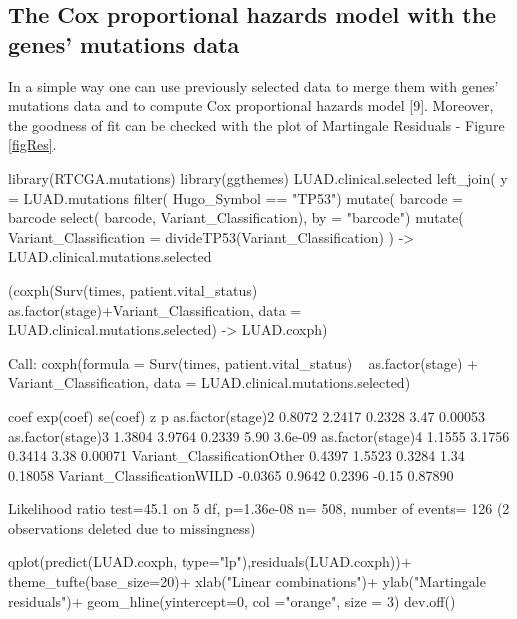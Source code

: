 \newpage

\subsection{The Cox proportional hazards model with the genes' mutations
data}\label{the-cox-proportional-hazards-model-with-the-genes-mutations-data}

In a simple way one can use previously selected data to merge them with
genes' mutations data and to compute Cox proportional hazards model
{[}9{]}. Moreover, the goodness of fit can be checked with the plot of
Martingale Residuals - Figure \ref{figRes}.

\begin{Schunk}
\begin{Sinput}
library(RTCGA.mutations)
library(ggthemes)
LUAD.clinical.selected %
      left_join( y = LUAD.mutations %
                    filter( Hugo_Symbol == "TP53") %
                    mutate( barcode = barcode %
                    select( barcode, Variant_Classification),
                 by = "barcode") %
                    mutate( Variant_Classification = divideTP53(Variant_Classification) ) ->
   LUAD.clinical.mutations.selected

(coxph(Surv(times, patient.vital_status)~ as.factor(stage)+Variant_Classification,
      data = LUAD.clinical.mutations.selected) -> LUAD.coxph)
\end{Sinput}
\begin{Soutput}
Call:
coxph(formula = Surv(times, patient.vital_status) ~ as.factor(stage) + 
    Variant_Classification, data = LUAD.clinical.mutations.selected)


                               coef exp(coef) se(coef)     z       p
as.factor(stage)2            0.8072    2.2417   0.2328  3.47 0.00053
as.factor(stage)3            1.3804    3.9764   0.2339  5.90 3.6e-09
as.factor(stage)4            1.1555    3.1756   0.3414  3.38 0.00071
Variant_ClassificationOther  0.4397    1.5523   0.3284  1.34 0.18058
Variant_ClassificationWILD  -0.0365    0.9642   0.2396 -0.15 0.87890

Likelihood ratio test=45.1  on 5 df, p=1.36e-08
n= 508, number of events= 126 
   (2 observations deleted due to missingness)
\end{Soutput}
\end{Schunk}

\begin{Schunk}
\begin{Sinput}
qplot(predict(LUAD.coxph, type="lp"),residuals(LUAD.coxph))+
   theme_tufte(base_size=20)+
   xlab("Linear combinations")+
   ylab("Martingale residuals")+
   geom_hline(yintercept=0, col ="orange", size = 3)
dev.off()
\end{Sinput}
\end{Schunk}

